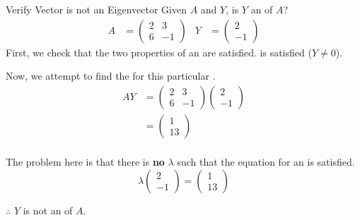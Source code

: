 \begin{example}{Verify Vector is not an Eigenvector}
  Given $A$ and $Y$, is $Y$ an  of $A$?
  \begin{align*}
    A &=
        \begin{pmatrix}
          2 & 3 \\
          6 & -1
        \end{pmatrix} &
                        Y &=
                            \begin{pmatrix}
                              2 \\
                              -1
                            \end{pmatrix}
  \end{align*}
  \tcblower{}
  First, we check that the two properties of an  are satisfied.
   is satisfied ($Y \neq 0$).

  Now, we attempt to find the  for this particular .
  \begin{align*}
    AY &=
         \begin{pmatrix}
           2 & 3 \\
           6 & -1
         \end{pmatrix}
               \begin{pmatrix}
                 2 \\
                 -1
               \end{pmatrix} \\
    &=
      \begin{pmatrix}
        1 \\
        13
      \end{pmatrix} \\
  \end{align*}

  The problem here is that there is \textbf{no} $\lambda$ such that the equation for an  is satisfied.
  \begin{equation*}
    \lambda
    \begin{pmatrix}
      2 \\
      -1
    \end{pmatrix}
    =
    \begin{pmatrix}
      1 \\
      13
    \end{pmatrix}
  \end{equation*}

  $\therefore$ $Y$ is not an  of $A$.
\end{example}

